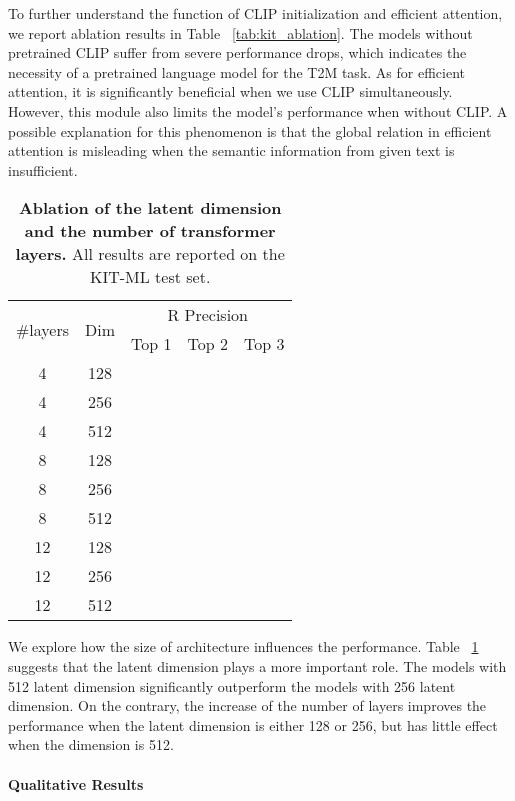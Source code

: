 To further understand the function of CLIP initialization and efficient attention, we report ablation results in Table ~\ref{tab:kit_ablation}. The models without pretrained CLIP suffer from severe performance drops, which indicates the necessity of a pretrained language model for the T2M task. As for efficient attention, it is significantly beneficial when we use CLIP simultaneously. However, this module also limits the model's performance when without CLIP. A possible explanation for this phenomenon is that the global relation in efficient attention is misleading when the semantic information from given text is insufficient.

\begin{table}[ht]
\centering
\caption{\textbf{Ablation of the latent dimension and the number of transformer layers.} All results are reported on the KIT-ML test set.}
\label{tab:kit_feat_layer}
\setlength{\tabcolsep}{1.4mm}
{
\begin{tabular}{ccccc}
\hline

\multirow{2}{1cm}{\centering \#layers} & \multirow{2}{1cm}{\centering Dim} & \multicolumn{3}{c}{\centering R Precision}  \\
& & Top 1 & Top 2 & Top 3 \\
\hline
4 & 128 &  &  &  \\
4 & 256 &  &  &  \\
4 & 512 &  &  &  \\
8 & 128 &  &  &  \\
8 & 256 &  &  &  \\
8 & 512 &  &  &  \\
12 & 128 &  &  &  \\
12 & 256 &  &  &  \\
12 & 512 &  &  &  \\
\hline
\end{tabular}}
\end{table}

We explore how the size of architecture influences the performance. Table ~\ref{tab:kit_feat_layer} suggests that the latent dimension plays a more important role. The models with 512 latent dimension significantly outperform the models with 256 latent dimension. On the contrary, the increase of the number of layers improves the performance when the latent dimension is either 128 or 256, but has little effect when the dimension is 512.

\paragraph{Qualitative Results}\label{sec4_1_4}

